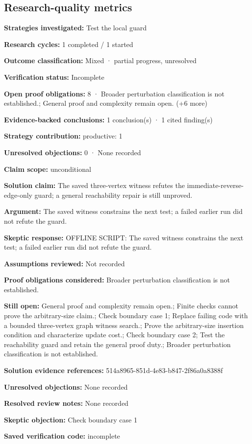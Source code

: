 \documentclass[11pt]{article}
\begin{document}
\subsection{Research-quality metrics}
\textbf{Strategies investigated:} Test the local guard\par
\textbf{Research cycles:} 1 completed / 1 started\par
\textbf{Outcome classification:} Mixed · partial progress, unresolved\par
\textbf{Verification status:} Incomplete\par
\textbf{Open proof obligations:} 8 · Broader perturbation classification is not established.; General proof and complexity remain open. (+6 more)\par
\textbf{Evidence-backed conclusions:} 1 conclusion(s) · 1 cited finding(s)\par
\textbf{Strategy contribution:} productive: 1\par
\textbf{Unresolved objections:} 0 · None recorded\par
\textbf{Claim scope:} unconditional\par
\textbf{Solution claim:} The saved three-vertex witness refutes the immediate-reverse-edge-only guard; a general reachability repair is still unproved.\par
\textbf{Argument:} The saved witness constrains the next test; a failed earlier run did not refute the guard.\par
\textbf{Skeptic response:} OFFLINE SCRIPT: The saved witness constrains the next test; a failed earlier run did not refute the guard.\par
\textbf{Assumptions reviewed:} Not recorded\par
\textbf{Proof obligations considered:} Broader perturbation classification is not established.\par
\textbf{Still open:} General proof and complexity remain open.; Finite checks cannot prove the arbitrary-size claim.; Check boundary case 1; Replace failing code with a bounded three-vertex graph witness search.; Prove the arbitrary-size insertion condition and characterize update cost.; Check boundary case 2; Test the reachability guard and retain the general proof duty.; Broader perturbation classification is not established.\par
\textbf{Solution evidence references:} 514a8965-851d-4e83-b847-2f86a0a8388f\par
\textbf{Unresolved objections:} None recorded\par
\textbf{Resolved review notes:} None recorded\par
\textbf{Skeptic objection:} Check boundary case 1\par
\textbf{Saved verification code:} incomplete\par
\end{document}

